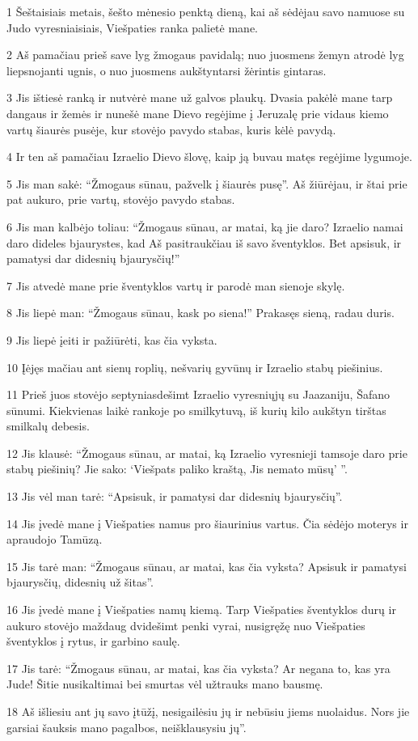 \par 1 Šeštaisiais metais, šešto mėnesio penktą dieną, kai aš sėdėjau savo namuose su Judo vyresniaisiais, Viešpaties ranka palietė mane. 
\par 2 Aš pamačiau prieš save lyg žmogaus pavidalą; nuo juosmens žemyn atrodė lyg liepsnojanti ugnis, o nuo juosmens aukštyn­tarsi žėrintis gintaras. 
\par 3 Jis ištiesė ranką ir nutvėrė mane už galvos plaukų. Dvasia pakėlė mane tarp dangaus ir žemės ir nunešė mane Dievo regėjime į Jeruzalę prie vidaus kiemo vartų šiaurės pusėje, kur stovėjo pavydo stabas, kuris kėlė pavydą. 
\par 4 Ir ten aš pamačiau Izraelio Dievo šlovę, kaip ją buvau matęs regėjime lygumoje. 
\par 5 Jis man sakė: “Žmogaus sūnau, pažvelk į šiaurės pusę”. Aš žiūrėjau, ir štai prie pat aukuro, prie vartų, stovėjo pavydo stabas. 
\par 6 Jis man kalbėjo toliau: “Žmogaus sūnau, ar matai, ką jie daro? Izraelio namai daro dideles bjaurystes, kad Aš pasitraukčiau iš savo šventyklos. Bet apsisuk, ir pamatysi dar didesnių bjaurysčių!” 
\par 7 Jis atvedė mane prie šventyklos vartų ir parodė man sienoje skylę. 
\par 8 Jis liepė man: “Žmogaus sūnau, kask po siena!” Prakasęs sieną, radau duris. 
\par 9 Jis liepė įeiti ir pažiūrėti, kas čia vyksta. 
\par 10 Įėjęs mačiau ant sienų roplių, nešvarių gyvūnų ir Izraelio stabų piešinius. 
\par 11 Prieš juos stovėjo septyniasdešimt Izraelio vyresniųjų su Jaazaniju, Šafano sūnumi. Kiekvienas laikė rankoje po smilkytuvą, iš kurių kilo aukštyn tirštas smilkalų debesis. 
\par 12 Jis klausė: “Žmogaus sūnau, ar matai, ką Izraelio vyresnieji tamsoje daro prie stabų piešinių? Jie sako: ‘Viešpats paliko kraštą, Jis nemato mūsų’ ”. 
\par 13 Jis vėl man tarė: “Apsisuk, ir pamatysi dar didesnių bjaurysčių”. 
\par 14 Jis įvedė mane į Viešpaties namus pro šiaurinius vartus. Čia sėdėjo moterys ir apraudojo Tamūzą. 
\par 15 Jis tarė man: “Žmogaus sūnau, ar matai, kas čia vyksta? Apsisuk ir pamatysi bjaurysčių, didesnių už šitas”. 
\par 16 Jis įvedė mane į Viešpaties namų kiemą. Tarp Viešpaties šventyklos durų ir aukuro stovėjo maždaug dvidešimt penki vyrai, nusigręžę nuo Viešpaties šventyklos į rytus, ir garbino saulę. 
\par 17 Jis tarė: “Žmogaus sūnau, ar matai, kas čia vyksta? Ar negana to, kas yra Jude! Šitie nusikaltimai bei smurtas vėl užtrauks mano bausmę. 
\par 18 Aš išliesiu ant jų savo įtūžį, nesigailėsiu jų ir nebūsiu jiems nuolaidus. Nors jie garsiai šauksis mano pagalbos, neišklausysiu jų”.



